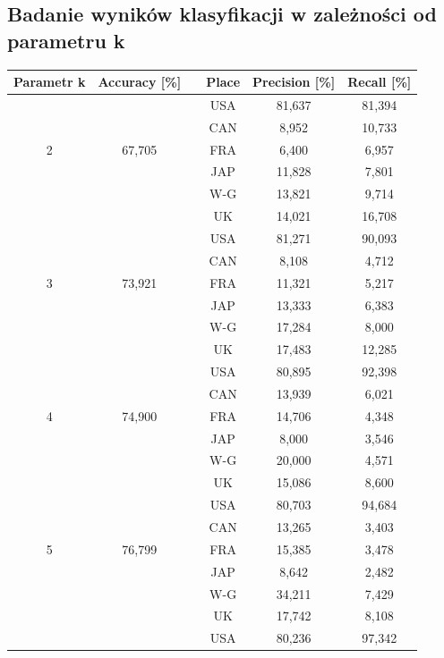 \documentclass{classrep}
\begin{document}
\subsection{Badanie wyników klasyfikacji w zależności od parametru k}
\begin{table}[h!]
	\centering
	\begin{tabular} {c c c c c c}
		\hline
		\textbf{Parametr k} & \textbf{Accuracy [\%]} & \vline & \textbf{Place} & \textbf{Precision [\%]} & \textbf{Recall [\%]}\\ [0.5ex] 
		\hline
		\hline 
		&   		&\vline& USA & 81,637 & 81,394 \\
		&			&\vline& CAN & 8,952 & 10,733 \\
		2 & 67,705	&\vline& FRA & 6,400 & 6,957 \\
		&			&\vline& JAP & 11,828 & 7,801 \\
		&			&\vline& W-G & 13,821 & 9,714 \\
		&			&\vline& UK  & 14,021 & 16,708 \\
		\hline 
		&   		&\vline& USA & 81,271 & 90,093 \\
		&			&\vline& CAN & 8,108 & 4,712 \\
		3 & 73,921	&\vline& FRA & 11,321 & 5,217 \\
		&			&\vline& JAP & 13,333 & 6,383 \\
		&			&\vline& W-G & 17,284 & 8,000 \\
		&			&\vline& UK  & 17,483 & 12,285 \\
		\hline 
		&   		&\vline& USA & 80,895 & 92,398 \\
		&			&\vline& CAN & 13,939 & 6,021 \\
		4 & 74,900 	&\vline& FRA & 14,706 & 4,348 \\
		&			&\vline& JAP & 8,000 & 3,546 \\
		&			&\vline& W-G & 20,000 & 4,571 \\
		&			&\vline& UK  & 15,086 & 8,600 \\
		\hline 
		&   		&\vline& USA & 80,703 & 94,684 \\
		&			&\vline& CAN & 13,265 & 3,403 \\
		5 & 76,799 	&\vline& FRA & 15,385 & 3,478 \\
		&			&\vline& JAP & 8,642 & 2,482 \\
		&			&\vline& W-G & 34,211 & 7,429 \\
		&			&\vline& UK  & 17,742 & 8,108 \\
		\hline 
		&   		&\vline& USA & 80,236 & 97,342 \\

\end{tabular}
\end{table}
\end{document}
